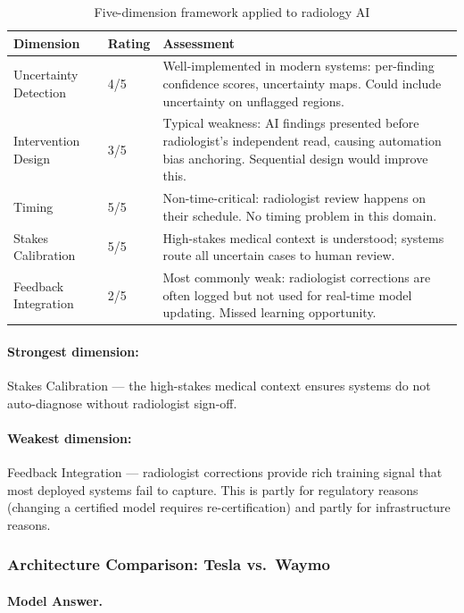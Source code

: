 \begin{table}[htbp]
\caption{Five-dimension framework applied to radiology AI}
\label{tab:radiology-five-dim-ch11}
\centering
\begin{tabular}{@{}p{3cm}p{1.5cm}p{7cm}@{}}
\toprule
\textbf{Dimension} & \textbf{Rating} & \textbf{Assessment} \\
\midrule
Uncertainty Detection & 4/5 & Well-implemented in modern systems: per-finding confidence scores, uncertainty maps. Could include uncertainty on unflagged regions. \\
Intervention Design & 3/5 & Typical weakness: AI findings presented before radiologist's independent read, causing automation bias anchoring. Sequential design would improve this. \\
Timing & 5/5 & Non-time-critical: radiologist review happens on their schedule. No timing problem in this domain. \\
Stakes Calibration & 5/5 & High-stakes medical context is understood; systems route all uncertain cases to human review. \\
Feedback Integration & 2/5 & Most commonly weak: radiologist corrections are often logged but not used for real-time model updating. Missed learning opportunity. \\
\bottomrule
\end{tabular}
\end{table}

\paragraph{Strongest dimension:} Stakes Calibration --- the high-stakes medical context ensures systems do not auto-diagnose without radiologist sign-off.

\paragraph{Weakest dimension:} Feedback Integration --- radiologist corrections provide rich training signal that most deployed systems fail to capture. This is partly for regulatory reasons (changing a certified model requires re-certification) and partly for infrastructure reasons.

\subsubsection{Architecture Comparison: Tesla vs.\ Waymo}

\paragraph{Model Answer.}

